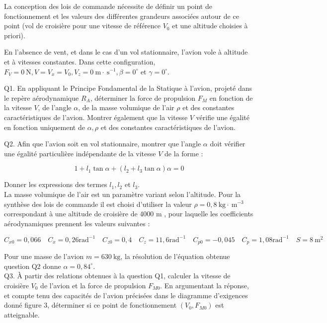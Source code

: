 \documentclass[10pt]{article}
\begin{document}
La conception des lois de commande nécessite de définir un point de fonctionnement et les valeurs des différentes grandeurs associées autour de ce point (vol de croisière pour une vitesse de référence $V_{0}$ et une altitude choisies à priori).

En l'absence de vent, et dans le cas d'un vol stationnaire, l'avion vole à altitude et à vitesses constantes. Dans cette configuration, $F_{V}=0 \mathrm{~N}, V=V_{x}=V_{0}, V_{z}=0 \mathrm{~m} \cdot \mathrm{~s}^{-1}, \beta=0^{\circ}$ et $\gamma=0^{\circ}$.

Q1. En appliquant le Principe Fondamental de la Statique à l'avion, projeté dans le repère aérodynamique $R_{A}$, déterminer la force de propulsion $F_{M}$ en fonction de la vitesse $V$, de l'angle $\alpha$, de la masse volumique de l'air $\rho$ et des constantes caractéristiques de l'avion. Montrer également que la vitesse $V$ vérifie une égalité en fonction uniquement de $\alpha, \rho$ et des constantes caractéristiques de l'avion.

Q2. Afin que l'avion soit en vol stationnaire, montrer que l'angle $\alpha$ doit vérifier une égalité particulière indépendante de la vitesse $V$ de la forme :

$$
1+l_{1} \tan \alpha+\left(l_{2}+l_{3} \tan \alpha\right) \alpha=0
$$

Donner les expressions des termes $l_{1}, l_{2}$ et $l_{3}$.\\
La masse volumique de l'air est un paramètre variant selon l'altitude. Pour la synthèse des lois de commande il est choisi d'utiliser la valeur $\rho=0,8 \mathrm{~kg} \cdot \mathrm{~m}^{-3}$ correspondant à une altitude de croisière de 4000 m , pour laquelle les coefficients aérodynamiques prennent les valeurs suivantes :

$$
C_{x 0}=0,066 \quad C_{x}=0,26 \mathrm{rad}^{-1} \quad C_{z 0}=0,4 \quad C_{z}=11,6 \mathrm{rad}^{-1} \quad C_{p 0}=-0,045 \quad C_{p}=1,08 \mathrm{rad}^{-1} \quad S=8 \mathrm{~m}^{2}
$$

Pour une masse de l'avion $m=630 \mathrm{~kg}$, la résolution de l'équation obtenue question Q2 donne $\alpha=0,84^{\circ}$.\\
Q3. À partir des relations obtenues à la question Q1, calculer la vitesse de croisière $V_{0}$ de l'avion et la force de propulsion $F_{M 0}$. En argumentant la réponse, et compte tenu des capacités de l'avion précisées dans le diagramme d'exigences donné figure 3, déterminer si ce point de fonctionnement $\left(V_{0}, F_{M 0}\right)$ est atteignable.
\end{document}
